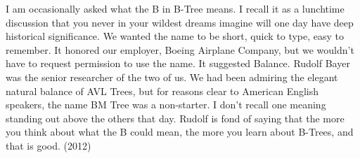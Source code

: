 I am occasionally asked what the B in B-Tree means.  
I recall it as a lunchtime discussion that you never in your wildest dreams imagine will one day have deep historical significance.  
We wanted the name to be short, quick to type, easy to remember.  It honored our employer, Boeing Airplane Company, 
but we wouldn't have to request permission to use the name.  It suggested Balance.  
Rudolf Bayer was the senior researcher of the two of us.  We had been admiring the elegant natural balance of AVL Trees, 
but for reasons clear to American English speakers, the name BM Tree was a non-starter. 
I don't recall one meaning standing out above the others that day.  
Rudolf is fond of saying that the more you think about what the B could mean, the more you learn about B-Trees, and that is good. 
(2012)
